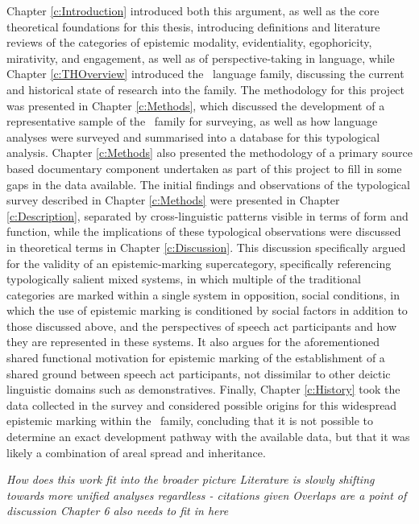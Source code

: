Chapter \ref{c:Introduction} introduced both this argument, as well as the core theoretical foundations for this thesis, introducing definitions and literature reviews of the categories of epistemic modality, evidentiality, egophoricity, mirativity, and engagement, as well as of perspective-taking in language, while Chapter \ref{c:THOverview} introduced the \lfam\ language family, discussing the current and historical state of research into the family. The methodology for this project was presented in Chapter \ref{c:Methods}, which discussed the development of a representative sample of the \lfam\ family for surveying, as well as how language analyses were surveyed and summarised into a database for this typological analysis. Chapter \ref{c:Methods} also presented the methodology of a primary source based documentary component undertaken as part of this project to fill in some gaps in the data available. The initial findings and observations of the typological survey described in Chapter \ref{c:Methods} were presented in Chapter \ref{c:Description}, separated by cross-linguistic patterns visible in terms of form and function, while the implications of these typological observations were discussed in theoretical terms in Chapter \ref{c:Discussion}. This discussion specifically argued for the validity of an epistemic-marking supercategory, specifically referencing typologically salient mixed systems, in which multiple of the traditional categories are marked within a single system in opposition, social conditions, in which the use of epistemic marking is conditioned by social factors in addition to those discussed above, and the perspectives of speech act participants and how they are represented in these systems. It also argues for the aforementioned shared functional motivation for epistemic marking of the establishment of a shared ground between speech act participants, not dissimilar to other deictic linguistic domains such as demonstratives. Finally, Chapter \ref{c:History} took the data collected in the survey and considered possible origins for this widespread epistemic marking within the \lfam\ family, concluding that it is not possible to determine an exact development pathway with the available data, but that it was likely a combination of areal spread and inheritance.

\textit{How does this work fit into the broader picture
Literature is slowly shifting towards more unified analyses regardless - citations given
Overlaps are a point of discussion
Chapter 6 also needs to fit in here}

